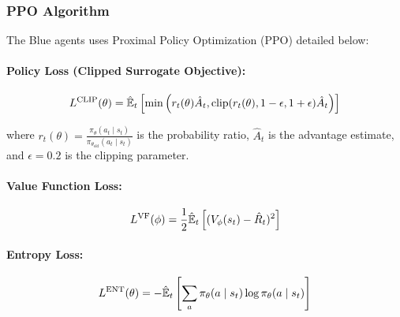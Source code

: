 \documentclass[12pt,oneside]{article}
\begin{document}

\subsubsection{PPO Algorithm}

The Blue agents uses Proximal Policy Optimization (PPO) detailed below:

\paragraph{Policy Loss (Clipped Surrogate Objective):}
\begin{equation}
L^{\text{CLIP}}(\theta) = \hat{\mathbb{E}}_t\left[\min\left(r_t(\theta)\hat{A}_t, \text{clip}(r_t(\theta), 1-\epsilon, 1+\epsilon)\hat{A}_t\right)\right]
\end{equation}

where $r_t(\theta) = \frac{\pi_\theta(a_t \mid s_t)}{\pi_{\theta_{\text{old}}}(a_t \mid s_t)}$ is the probability ratio, $\hat{A}_t$ is the advantage estimate, and $\epsilon = 0.2$ is the clipping parameter.

\paragraph{Value Function Loss:}
\begin{equation}
L^{\text{VF}}(\phi) = \frac{1}{2}\hat{\mathbb{E}}_t\left[(V_\phi(s_t) - \hat{R}_t)^2\right]
\end{equation}

\paragraph{Entropy Loss:}
\begin{equation}
L^{\text{ENT}}(\theta) = -\hat{\mathbb{E}}_t\left[\sum_a \pi_\theta(a \mid s_t) \log \pi_\theta(a \mid s_t)\right]
\end{equation}
\end{document}
